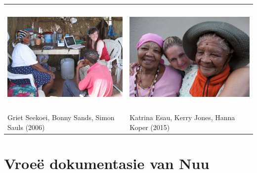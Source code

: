 \makeatletter
\begin{center}
\begin{tabular}{ll}
    \includegraphics[height=5.5cm]{seekoei_sands_sauls_crop.jpg} &
    \includegraphics[height=5.5cm]{esau_jones_koper.jpg} \\
       Griet Seekoei, Bonny Sands, Simon Sauls
       (2006)\footnotemark\global\let\saved@Href@BS\Hy@footnote@currentHref
       &
       Katrina Esau, Kerry Jones, Hanna Koper
       (2015)\footnotemark\global\let\saved@Href@PW\Hy@footnote@currentHref
\end{tabular}
\end{center}
\addtocounter{footnote}{-1}
\let\Hy@footnote@currentHref\saved@Href@BS
{}
\let\Hy@footnote@currentHref\saved@Href@PW
{}
\makeatother


\newpage


\markboth{}{}
\section{Vroe\"{e} dokumentasie van N\textipa{\textvertline}uu}
\markboth{}{}

